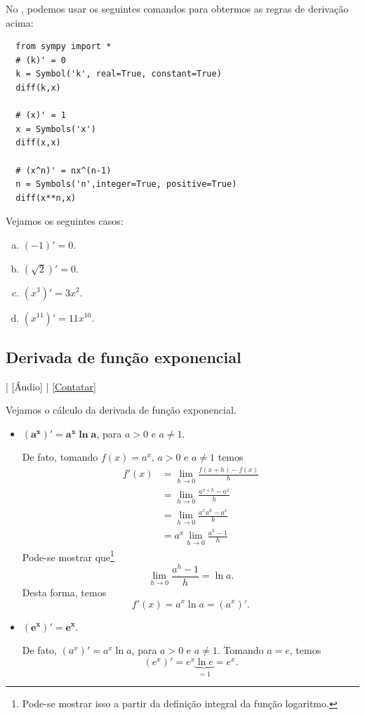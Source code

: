 \ifispython
No \sympy, podemos usar os seguintes comandos para obtermos as regras de derivação acima:
\begin{lstlisting}
  from sympy import *
  # (k)' = 0
  k = Symbol('k', real=True, constant=True)
  diff(k,x)

  # (x)' = 1
  x = Symbols('x')
  diff(x,x)

  # (x^n)' = nx^(n-1)
  n = Symbols('n',integer=True, positive=True)
  diff(x**n,x)
\end{lstlisting}
\fi

\begin{ex}
  Vejamos os seguintes casos:
  \begin{enumerate}[a)]
  \item $(-1)' = 0$.
  \item $(\sqrt{2})' = 0$.
  \item $(x^3)' = 3x^2$.
  \item $(x^{11})' = 11x^{10}$.
  \end{enumerate}
\end{ex}

\subsection{Derivada de função exponencial}

\begin{flushright}
  [Vídeo] | [Áudio] | \href{https://phkonzen.github.io/notas/contato.html}{[Contatar]}
\end{flushright}

Vejamos o cálculo da derivada de função exponencial.

\begin{itemize}
\item $\pmb{(a^x)' = a^x\ln a}$, para $a>0$ e $a\neq 1$.
  
  De fato, tomando $f(x) = a^x$, $a>0$ e $a\neq 1$ temos
  \begin{align}
    f'(x) &= \lim_{h\to 0} \frac{f(x+h)-f(x)}{h}\\
          &= \lim_{h\to 0} \frac{a^{x+h}-a^x}{h} \\
          &= \lim_{h\to 0} \frac{a^xa^h-a^x}{h} \\
          &= a^x \lim_{h\to 0} \frac{a^h-1}{h}
  \end{align}
  Pode-se mostrar que\footnote{Pode-se mostrar isso a partir da definição integral da função logaritmo.}
  \begin{equation}
    \lim_{h\to 0} \frac{a^h-1}{h} = \ln a.
  \end{equation}
  Desta forma, temos
  \begin{equation}
    f'(x) = a^x\ln a = (a^x)'.
  \end{equation}

\item $\pmb{(e^x)' = e^x}$.

  De fato, $(a^x)' = a^x\ln a$, para $a>0$ e $a\neq 1$. Tomando $a = e$, temos
  \begin{equation}
    (e^x)' = e^x\underbrace{\ln e}_{=1} = e^x.
  \end{equation}
\end{itemize}

